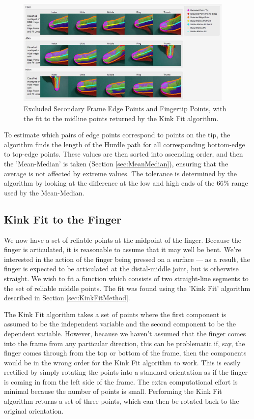\begin{figure}[h!]
  \centering
    \includegraphics[width=0.95\textwidth]{Chapter4/Figs/ExcludedEdgePointsAndMidlineFit.jpg}
    \caption{Excluded Secondary Frame Edge Points and Fingertip Points, with the fit to the midline points returned by the Kink Fit algorithm.}\label{fig:ExcludedEdgePointsAndMidlineFit}
\end{figure}

To estimate which pairs of edge points correspond to points on the tip, the algorithm finds the length of the Hurdle path for all corresponding bottom-edge to top-edge points. These values are then sorted into ascending order, and then the 'Mean-Median' is taken (Section \ref{sec:MeanMedian}), ensuring that the average is not affected by extreme values. The tolerance is determined by the algorithm by looking at the difference at the low and high ends of the $66\%$ range used by the Mean-Median.

\subsection{Kink Fit to the Finger}\label{sec:KinkFitToTheFinger}
We now have a set of reliable points at the midpoint of the finger. Because the finger is articulated, it is reasonable to assume that it may well be bent. We're interested in the action of the finger being pressed on a surface --- as a result, the finger is expected to be articulated at the distal-middle joint, but is otherwise straight. We wish to fit a function which consists of two straight-line segments to the set of reliable middle points. The fit was found using the 'Kink Fit' algorithm described in Section \ref{sec:KinkFitMethod}.

The Kink Fit algorithm takes a set of points where the first component is assumed to be the independent variable and the second component to be the dependent variable. However, because we haven't assumed that the finger comes into the frame from any particular direction, this can be problematic if, say, the finger comes through from the top or bottom of the frame, then the components would be in the wrong order for the Kink Fit algorithm to work. This is easily rectified by simply rotating the points into a standard orientation as if the finger is coming in from the left side of the frame. The extra computational effort is minimal because the number of points is small. Performing the Kink Fit algorithm returns a set of three points, which can then be rotated back to the original orientation.

